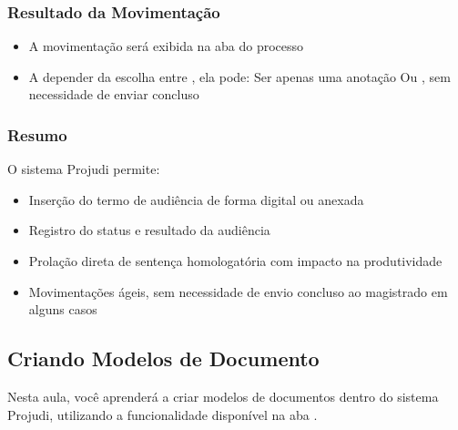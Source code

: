 \documentclass[letterpaper,10pt,brazil]{sphinxmanual}
\begin{document}
\subsubsection{Resultado da Movimentação}
\label{\detokenize{projud_47_movimentacaoaudiencia:resultado-da-movimentacao}}\begin{itemize}
\item {} 
\sphinxAtStartPar
A movimentação será exibida na aba  do processo

\item {} 
\sphinxAtStartPar
A depender da escolha entre , ela pode:
\sphinxhyphen{} Ser apenas uma anotação
\sphinxhyphen{} Ou , sem necessidade de enviar concluso

\end{itemize}


\subsubsection{Resumo}
\label{\detokenize{projud_47_movimentacaoaudiencia:resumo}}
\sphinxAtStartPar
O sistema Projudi permite:
\begin{itemize}
\item {} 
\sphinxAtStartPar
Inserção do termo de audiência de forma digital ou anexada

\item {} 
\sphinxAtStartPar
Registro do status e resultado da audiência

\item {} 
\sphinxAtStartPar
Prolação direta de sentença homologatória com impacto na produtividade

\item {} 
\sphinxAtStartPar
Movimentações ágeis, sem necessidade de envio concluso ao magistrado em alguns casos

\end{itemize}

\sphinxstepscope


\subsection{Criando Modelos de Documento}
\label{\detokenize{projud_48_criandomodelo:criando-modelos-de-documento}}\label{\detokenize{projud_48_criandomodelo::doc}}
\sphinxAtStartPar
Nesta aula, você aprenderá a criar modelos de documentos dentro do sistema Projudi, utilizando a funcionalidade disponível na aba .
\end{document}
